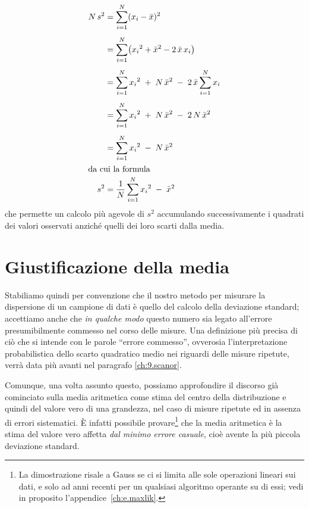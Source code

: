 \begin{align*}%
\index{varianza!propriet\`a matematiche|(}
  N \, s^2 &= \sum_{i=1}^N ( x_i - \bar x ) ^2 \\[1ex]
  &= \sum_{i=1}^N \bigl( {x_i}^2 +
    \bar x ^2 - 2 \, \bar x \, x_i \bigr) \\[1ex]
  &= \sum_{i=1}^N {x_i}^2 \; + \; N \, \bar x ^2 \; - \;
    2 \, \bar x \sum_{i=1}^N x_i \\[1ex]
  &= \sum_{i=1}^N {x_i}^2 \; + \; N \, \bar x ^2 \; - \;
    2 \, N \, \bar x ^2 \\[1ex]
  &= \sum_{i=1}^N {x_i}^2 \; - \; N \, \bar x ^2 \\
\intertext{da cui la formula}
  s^2 &= \frac{1}{N} \sum_{i=1}^N {x_i}^2 \; - \; \bar x ^2
\end{align*}
che permette un calcolo pi\`u agevole di $s^2$ accumulando
successivamente i quadrati dei valori
osservati anzich\'e quelli dei loro scarti dalla media.%
%
%
%

\section{Giustificazione della media}%
%
\label{ch:4.giumed}
Stabiliamo quindi per convenzione che il nostro metodo per
misurare la dispersione di un campione di dati \`e quello
del calcolo della deviazione standard; accettiamo anche che
\emph{in qualche modo} questo numero sia legato all'errore
presumibilmente commesso nel corso delle misure.  Una
definizione pi\`u precisa di ci\`o che si intende con le
parole ``errore commesso'', ovverosia l'interpretazione
probabilistica dello scarto quadratico medio nei riguardi
delle misure ripetute, verr\`a data pi\`u avanti nel
paragrafo \ref{ch:9.scanor}.

Comunque, una volta assunto questo, possiamo approfondire il
discorso gi\`a cominciato sulla media aritmetica come stima
del centro della distribuzione e quindi del valore vero di
una grandezza, nel caso di misure ripetute ed in assenza di
errori sistematici.  \`E infatti possibile
provare\/\footnote{La   dimostrazione risale a Gauss%
  se ci si limita alle sole operazioni lineari sui dati, e
  solo ad anni recenti per un qualsiasi algoritmo operante
  su di essi; vedi in proposito
  l'appendice~\ref{ch:e.maxlik}.} che la media aritmetica
\`e la stima del valore vero affetta \emph{dal minimo errore
  casuale},%
cio\`e avente la pi\`u piccola deviazione standard.

